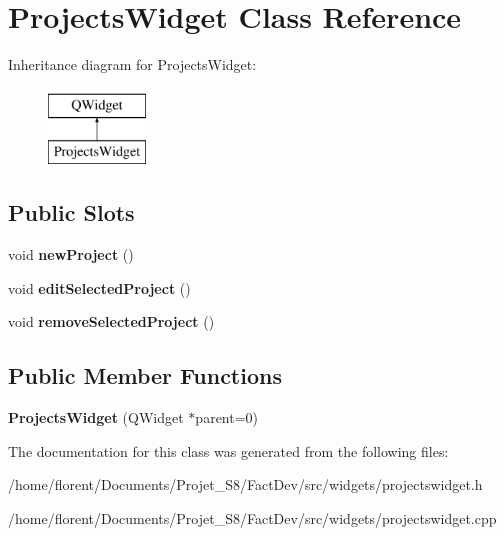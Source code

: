 \hypertarget{classProjectsWidget}{\section{Projects\-Widget Class Reference}
\label{classProjectsWidget}
}
Inheritance diagram for Projects\-Widget\-:\begin{figure}[H]
\begin{center}
\leavevmode
\includegraphics[height=2.000000cm]{de/da7/classProjectsWidget}
\end{center}
\end{figure}
\subsection*{Public Slots}
\begin{DoxyCompactItemize}
\item 
\hypertarget{classProjectsWidget_a9a3e158093ed435a68d4d9874a22a128}{void {\bfseries new\-Project} ()}\label{classProjectsWidget_a9a3e158093ed435a68d4d9874a22a128}

\item 
\hypertarget{classProjectsWidget_a026e17f035717e382f4afca6896a72d3}{void {\bfseries edit\-Selected\-Project} ()}\label{classProjectsWidget_a026e17f035717e382f4afca6896a72d3}

\item 
\hypertarget{classProjectsWidget_a038205ca1dee68dadae84e31dabfd7fc}{void {\bfseries remove\-Selected\-Project} ()}\label{classProjectsWidget_a038205ca1dee68dadae84e31dabfd7fc}

\end{DoxyCompactItemize}
\subsection*{Public Member Functions}
\begin{DoxyCompactItemize}
\item 
\hypertarget{classProjectsWidget_a542fb678c61897b56c86dc58524bd969}{{\bfseries Projects\-Widget} (Q\-Widget $\ast$parent=0)}\label{classProjectsWidget_a542fb678c61897b56c86dc58524bd969}

\end{DoxyCompactItemize}


The documentation for this class was generated from the following files\-:\begin{DoxyCompactItemize}
\item 
/home/florent/\-Documents/\-Projet\-\_\-\-S8/\-Fact\-Dev/src/widgets/projectswidget.\-h\item 
/home/florent/\-Documents/\-Projet\-\_\-\-S8/\-Fact\-Dev/src/widgets/projectswidget.\-cpp\end{DoxyCompactItemize}
